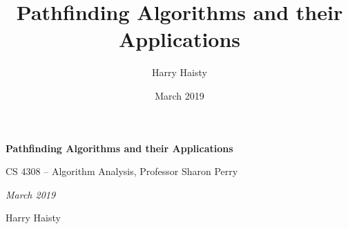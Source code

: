 \documentclass[12pt]{article}
\title{Pathfinding Algorithms and their Applications}
\author{Harry Haisty}
\date{March 2019}
\begin{document}
\begin{titlepage}
   \begin{center}
       \vspace*{4cm}
 
       \textbf{Pathfinding Algorithms and their Applications}
 
       \vspace{0.5cm}
        CS 4308 -- Algorithm Analysis, Professor Sharon Perry
\begin{center}
            \textit{March 2019}

\end{center}
       \vspace{.1cm} 
       Harry Haisty
       \vspace{.3cm}
       \vfill
 
       \vspace{0.8cm}
   \end{center}
\end{titlepage}
\end{document}
